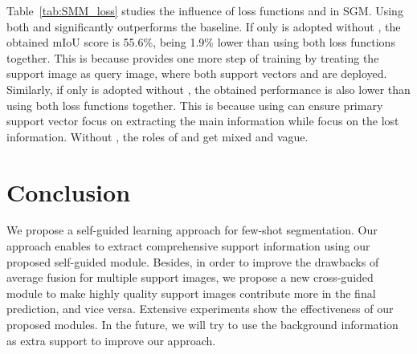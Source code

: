\documentclass[final]{cvpr}
\begin{document}
Table~\ref{tab:SMM_loss} studies the influence of loss functions  and  in SGM. Using both  and  significantly outperforms the baseline. If only  is adopted without , the obtained mIoU score is 55.6\%, being 1.9\% lower than using both loss functions together. This is because   provides one more step of training by treating the support image as query image, where both support vectors  and  are deployed. Similarly, if only  is adopted without , the obtained performance is also lower than using both loss functions together. This is because using  can ensure primary support vector  focus on extracting the main information while  focus on the lost information. Without , the roles of  and  get mixed and vague. 


\section{Conclusion}
We propose a self-guided learning approach for few-shot segmentation. Our approach enables to extract comprehensive support information using our proposed self-guided module. Besides, in order to improve the drawbacks of average fusion for multiple support images, we propose a new cross-guided module to make highly quality support images contribute more in the final prediction, and vice versa. Extensive experiments show the effectiveness of our proposed modules. In the future, we will try to use the background information as extra support to improve our approach.

{\small
	
	
}
\end{document}
